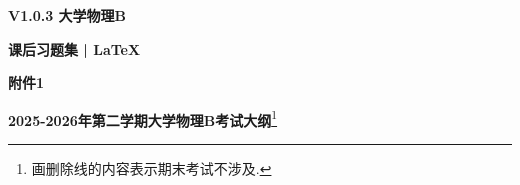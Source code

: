\maketitle

\thispagestyle{empty}

\vspace{6.5cm}

\begin{center}
    \songti
    \textbf{V1.0.3 大学物理B} 

    \textbf{课后习题集 | \LaTeX}
\end{center}

\newpage

\thispagestyle{empty}

\begin{flushleft}
	\songti
	\textbf{附件1}
\end{flushleft}

\begin{center}
	\songti
	\textbf{2025-2026年第二学期大学物理B考试大纲}\footnote{画删除线的内容表示期末考试不涉及.}
\end{center}

